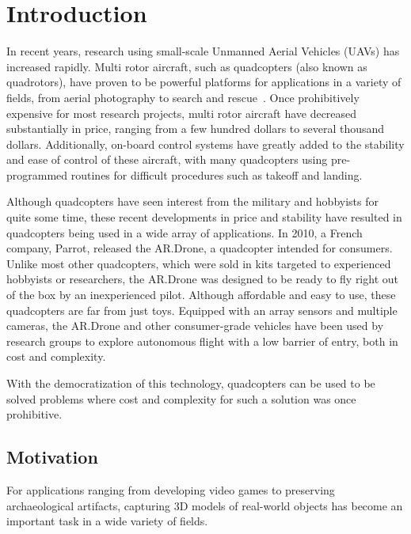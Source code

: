 
\chapter{Introduction\label{ch:intro}}

In recent years, research using small-scale Unmanned Aerial Vehicles (UAVs) has increased rapidly. Multi rotor aircraft, such as quadcopters (also known as quadrotors), have proven to be powerful platforms for applications in a variety of fields, from aerial photography to search and rescue~\cite{Irschara, Gupte}. Once prohibitively expensive for most research projects, multi rotor aircraft have decreased substantially in price, ranging from a few hundred dollars to several thousand dollars. Additionally, on-board control systems have greatly added to the stability and ease of control of these aircraft, with many quadcopters using pre-programmed routines for difficult procedures such as takeoff and landing.


Although quadcopters have seen interest from the military and hobbyists for quite some time, these recent developments in price and stability have resulted in quadcopters being used in a wide array of applications. In 2010, a French company, Parrot, released the AR.Drone, a quadcopter intended for consumers. Unlike most other quadcopters, which were sold in kits targeted to experienced hobbyists or researchers, the AR.Drone was designed to be ready to fly right out of the box by an inexperienced pilot. Although affordable and easy to use, these quadcopters are far from just toys. Equipped with an array sensors and multiple cameras, the AR.Drone and other consumer-grade vehicles have been used by research groups to explore autonomous flight with a low barrier of entry, both in cost and complexity.

With the democratization of this technology, quadcopters can be used to be solved problems where cost and complexity for such a solution was once prohibitive.

\section{Motivation}

For applications ranging from developing video games to preserving archaeological artifacts, capturing 3D models of real-world objects has become an important task in a wide variety of fields. %

